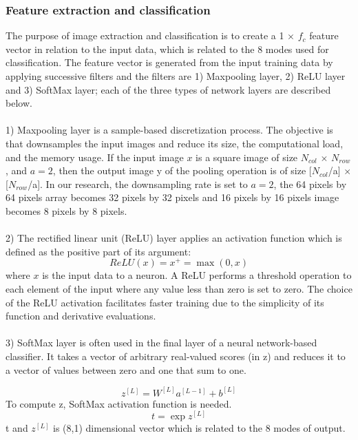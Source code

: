 \subsubsection{Feature extraction and classification}
\label{subsubsec3}
The purpose of image extraction and classification is to create a 1 $\times$ $f_c$ feature vector in relation to the input data, which is related to the 8 modes used for classification.
The feature vector is generated from the input training data by applying successive filters and the filters are 1) Maxpooling layer, 2) ReLU layer and 3) SoftMax layer; each of the three types of network layers are described below.
\\
\\
1) Maxpooling layer \cite{Ref27} is a sample-based discretization process. The objective is that  downsamples the input images and reduce its size, the computational load, and the memory usage. If the input image $x$ is a square image of size $N_{col}$ $\times$ $N_{row}$, and $a = 2$, then the output image y of the pooling operation is of size [$N_{col}$/a] $\times$ [$N_{row}$/a]. In our research, the downsampling rate is set to $a = 2$,
the 64 pixels by 64 pixels array becomes 32 pixels by 32 pixels and 16 pixels by 16 pixels image becomes 8 pixels by 8 pixels.
\\
\\
2) The rectified linear unit (ReLU) layer \cite{Ref28} applies an activation function which is defined as the positive part of its argument: %
\begin{equation}
ReLU(x) = x^{+} = \max(0,x) 
\end{equation}
where $x$ is the input data to a neuron. A ReLU performs a threshold operation
to each element of the input where any value less than zero is set to zero.
The choice of the ReLU activation facilitates faster training due to the simplicity of its function and derivative evaluations.
\\
\\
3) SoftMax layer \cite{Ref29} is often used in the final layer of a neural network-based classifier.  It takes a vector of arbitrary real-valued scores (in z) and reduces it to a vector of values between zero and one that sum to one.

\begin{equation}
z^{[L]}=W^{[L]}a^{[L-1]}+b^{[L]} 
\end{equation}
To compute z, SoftMax activation function is needed.
\begin{equation}
t = \exp z^{[L]}
\end{equation}
t and $z^{[L]}$ is (8,1) dimensional vector which is related to the 8 modes of output.

